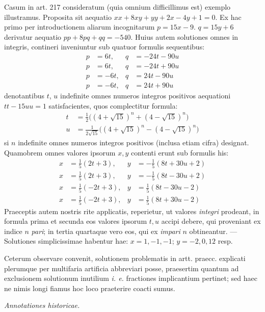 Casum in art. 217 consideratum (quia omnium difficillimus est) exemplo illustramus.
Proposita sit aequatio $xx+8xy+yy+2x-4y+1=0$. Ex hac primo per introductionem
aliarum incognitarum $p=15x-9$. $q=15y+6$ derivatur aequatio
$pp+8pq+qq=-540$. Huius autem solutiones omnes in integris, contineri inveniuntur
sub quatuor formulis sequentibus:
\[
\begin{aligned}
p&=6t,&q&=-24t-90u\\
p&=6t,&q&=-24t+90u\\
p&=-6t,&q&=24t-90u\\
p&=-6t,&q&=24t+90u
\end{aligned}
\]
denotantibus $t$, $u$ indefinite omnes numeros integros positivos aequationi
$tt-15uu=1$ satisfacientes, quos complectitur formula:
\[
\begin{aligned}
t&=\tfrac{1}{2}\bigl((4+\sqrt{15})^n+(4-\sqrt{15})^n\bigr)\\
u&=\frac{1}{2\sqrt{15}}\bigl((4+\sqrt{15})^n-(4-\sqrt{15})^n\bigr)
\end{aligned}
\]
si $n$ indefinite omnes numeros integros positivos (inclusa etiam cifra) designat.
Quamobrem omnes valores ipsorum $x,y$ contenti erunt sub formulis his:
\[
\begin{aligned}
x&=\tfrac{1}{5}(2t+3),&y&=-\tfrac{1}{5}(8t+30u+2)\\
x&=\tfrac{1}{5}(2t+3),&y&=-\tfrac{1}{5}(8t-30u+2)\\
x&=\tfrac{1}{5}(-2t+3),&y&=\tfrac{1}{5}(8t-30u-2)\\
x&=\tfrac{1}{5}(-2t+3),&y&=\tfrac{1}{5}(8t+30u-2)
\end{aligned}
\]
Praeceptis autem nostris rite applicatis, reperietur, ut valores \textit{integri}
prodeant, in formula prima et secunda eos valores ipsorum $t,u$ accipi debere,
qui proveniant ex indice $n$ \textit{pari}; in tertia quartaque vero eos,
qui ex \textit{impari} $n$ obtineantur. --- Solutiones simplicissimae habentur
hae: $x=1,-1,-1$; $y=-2,0,12$ resp.

Ceterum observare convenit, solutionem problematis in artt. praecc. explicati
plerumque per multifaria artificia abbreviari posse, praesertim quantum ad
exclusionem solutionum inutilium \textit{i. e.} fractiones implicantium pertinet;
sed haec ne nimis longi fiamus hoc loco praeterire coacti sumus.

\begin{center}
\textit{Annotationes historicae.}
\end{center}

